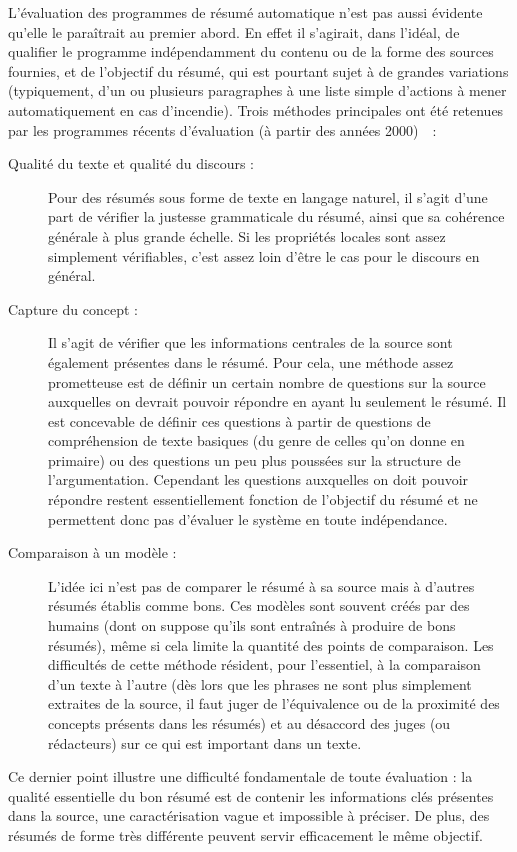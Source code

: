 \documentclass{article}           %
\begin{document}
L'évaluation des programmes de résumé automatique n'est pas aussi évidente qu'elle le paraîtrait au premier abord. En effet il s'agirait, dans l'idéal, de qualifier le programme indépendamment du contenu ou de la forme des sources fournies, et de l'objectif du résumé, qui est pourtant sujet à de grandes variations (typiquement, d'un ou plusieurs paragraphes à une liste simple d'actions à mener automatiquement en cas d'incendie). Trois méthodes principales ont été retenues par les programmes récents d'évaluation (à partir des années 2000)~\cite[p.1453-1461]{jones_automatic_2007}~:
\begin{description}
  \item [Qualité du texte et qualité du discours :] Pour des résumés sous forme de texte en langage naturel, il s'agit d'une part de vérifier la justesse grammaticale du résumé, ainsi que sa cohérence générale à plus grande échelle. Si les propriétés locales sont assez simplement vérifiables, c'est assez loin d'être le cas pour le discours en général.
  \item [Capture du concept :] Il s'agit de vérifier que les informations centrales de la source sont également présentes dans le résumé. Pour cela, une méthode assez prometteuse est de définir un certain nombre de questions sur la source auxquelles on devrait pouvoir répondre en ayant lu seulement le résumé. Il est concevable de définir ces questions à partir de questions de compréhension de texte basiques (du genre de celles qu'on donne en primaire) ou des questions un peu plus poussées sur la structure de l'argumentation. Cependant les questions auxquelles on doit pouvoir répondre restent essentiellement fonction de l'objectif du résumé et ne permettent donc pas d'évaluer le système en toute indépendance.
  \item [Comparaison à un modèle :] L'idée ici n'est pas de comparer le résumé à sa source mais à d'autres résumés établis comme bons. Ces modèles sont souvent créés par des humains (dont on suppose qu'ils sont entraînés à produire de bons résumés), même si cela limite la quantité des points de comparaison. Les difficultés de cette méthode résident, pour l'essentiel, à la comparaison d'un texte à l'autre (dès lors que les phrases ne sont plus simplement extraites de la source, il faut juger de l'équivalence ou de la proximité des concepts présents dans les résumés) et au désaccord des juges (ou rédacteurs) sur ce qui est important dans un texte.
 \end{description}
  
  Ce dernier point illustre une difficulté fondamentale de toute évaluation : la qualité essentielle du bon résumé est de contenir les informations clés présentes dans la source, une caractérisation vague et impossible à préciser. De plus, des résumés de forme très différente peuvent servir efficacement le même objectif.
\end{document}

